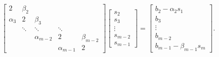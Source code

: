 \begin{equation}
    \begin{bmatrix}
        2 & \beta_2 \\
        \alpha_3 & 2 & \beta_3 \\
        & \ddots & \ddots & \ddots \\
        && \alpha_{m - 2} & 2 & \beta_{m - 2} \\
        &&& \alpha_{m - 1} & 2
    \end{bmatrix}
    \begin{bmatrix}
        s_2 \\ s_3 \\ \vdots \\ s_{m - 2} \\ s_{m - 1}
    \end{bmatrix}
    =
    \begin{bmatrix}
        b_2 - \alpha_2 s_1 \\
        b_3 \\
        \vdots \\
        b_{m - 2} \\
        b_{m - 1} - \beta_{m - 1} s_m
    \end{bmatrix}.
\end{equation}

